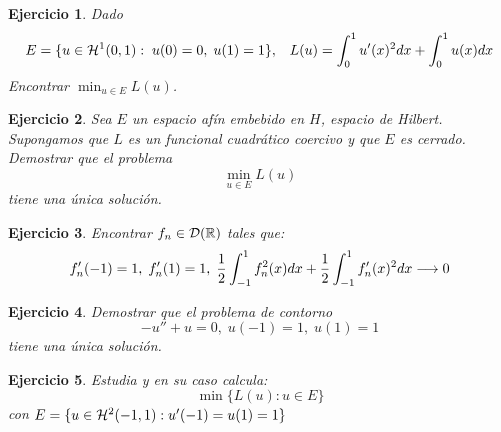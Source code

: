 \documentclass[12pt]{article}
\newtheorem{ejercicio}{Ejercicio}
\theoremstyle{definition}
\theoremstyle{remark}
\begin{document}
\begin{ejercicio}
Dado
\[
E=\{u\in\sobolev[0,1]{1}: \; u(0)=0, \; u(1)=1\}, \espacio L(u)=\integral{0}{1}{u'(x)^2dx}+\integral{0}{1}{u(x)dx}
\]
Encontrar $\min_{u\in E}L(u)$.
\end{ejercicio}

\begin{ejercicio}
Sea $E$ un espacio afín embebido en $H$, espacio de Hilbert. Supongamos que $L$ es un funcional cuadrático coercivo y que $E$ es cerrado. Demostrar que el problema 
\[
\min_{u\in E}L(u)
\]
tiene una única solución.
\end{ejercicio}

\begin{ejercicio}
Encontrar $f_n\in\mathcal{D}(\R)$ tales que:
\[
f_n'(-1)=1, \; f_n'(1)=1, \; \frac{1}{2}\integral{-1}{1}{f_n^2(x)dx}+\frac{1}{2}\integral{-1}{1}{f_n'(x)^2dx}\longrightarrow 0
\]
\end{ejercicio}

\begin{ejercicio}
Demostrar que el problema de contorno
\[
-u''+u=0, \; u(-1)=1, \; u(1)=1
\]
tiene una única solución.
\end{ejercicio}

\begin{ejercicio}
Estudia y en su caso calcula:
\[
\min\{L(u):u\in E\}
\]
con $E=\{u\in\sobolev[-1,1]{2}: u'(-1)=u(1)=1\}$
\end{ejercicio}
\end{document}
